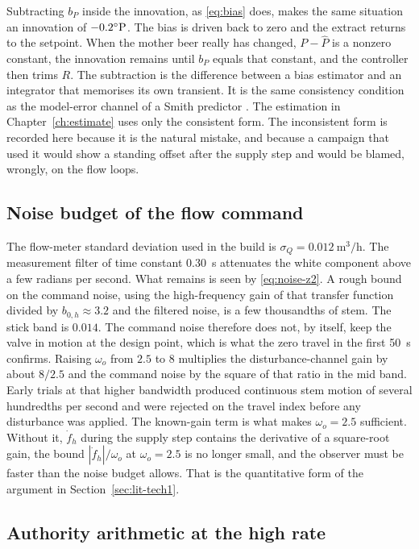 Subtracting $b_P$ inside the innovation, as \eqref{eq:bias} does, makes the same situation an innovation of $-0.2^{\circ}\mathrm{P}$. The bias is driven back to zero and the extract returns to the setpoint. When the mother beer really has changed, $P-\hat{P}$ is a nonzero constant, the innovation remains until $b_P$ equals that constant, and the controller then trims $R$. The subtraction is the difference between a bias estimator and an integrator that memorises its own transient. It is the same consistency condition as the model-error channel of a Smith predictor \cite{smith1957closer,normey2008survey,zheng2014predictive}. The estimation in Chapter~\ref{ch:estimate} uses only the consistent form. The inconsistent form is recorded here because it is the natural mistake, and because a campaign that used it would show a standing offset after the supply step and would be blamed, wrongly, on the flow loops.

\subsection{Noise budget of the flow command}

The flow-meter standard deviation used in the build is $\sigma_Q=\SI{0.012}{\cubic\metre\per\hour}$. The measurement filter of time constant \SI{0.30}{s} attenuates the white component above a few radians per second. What remains is seen by \eqref{eq:noise-z2}. A rough bound on the command noise, using the high-frequency gain of that transfer function divided by $b_{0,h}\approx 3.2$ and the filtered noise, is a few thousandths of stem. The stick band is $0.014$. The command noise therefore does not, by itself, keep the valve in motion at the design point, which is what the zero travel in the first \SI{50}{s} confirms. Raising $\omega_o$ from $2.5$ to $8$ multiplies the disturbance-channel gain by about $8/2.5$ and the command noise by the square of that ratio in the mid band. Early trials at that higher bandwidth produced continuous stem motion of several hundredths per second and were rejected on the travel index before any disturbance was applied. The known-gain term is what makes $\omega_o=2.5$ sufficient. Without it, $\dot{f}_h$ during the supply step contains the derivative of a square-root gain, the bound $|\dot{f}_h|/\omega_o$ at $\omega_o=2.5$ is no longer small, and the observer must be faster than the noise budget allows. That is the quantitative form of the argument in Section~\ref{sec:lit-tech1}.

\subsection{Authority arithmetic at the high rate}

